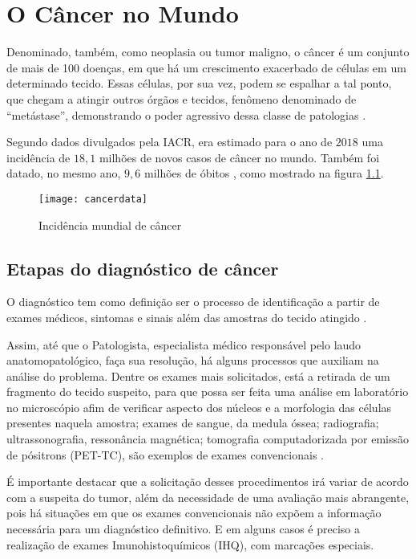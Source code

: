 \chapter{O Câncer no Mundo}
\label{chapter:o_cancer_no_mundo}

Denominado, também, como neoplasia ou tumor maligno, o câncer é um conjunto de
mais de 100 doenças, em que há um crescimento exacerbado de células em um
determinado tecido. Essas células, por sua vez, podem se espalhar a tal ponto,
que chegam a atingir outros órgãos e tecidos, fenômeno denominado de
“metástase”, demonstrando o poder agressivo dessa classe de patologias \cite{OQUEECANCER}.

Segundo dados divulgados pela IACR, 
era estimado para o ano de $2018$ uma incidência de $18,1$ milhões de novos casos de câncer no mundo.
Também foi datado, no mesmo ano, $9,6$ milhões de óbitos \cite{MOC}, como mostrado na figura \ref{fig:cancerdata}.

\begin{figure}[H]
\begin{center}
\caption{Incidência mundial de câncer}
\texttt{[image: cancerdata]}
\label{fig:cancerdata}
\end{center}
\end{figure}

\section{\textbf{Etapas do diagnóstico de câncer}}

O diagnóstico tem como definição ser o processo de identificação a partir de
exames médicos, sintomas e sinais além das amostras do tecido atingido \cite{ATLAS}.

Assim, até que o Patologista, especialista médico responsável pelo laudo anatomopatológico,
faça sua resolução, há alguns processos que auxiliam na análise do problema.
Dentre os exames mais solicitados, está a retirada de um fragmento do tecido suspeito,
para que possa ser feita uma análise em laboratório no microscópio afim de verificar aspecto dos núcleos e
a morfologia das células presentes naquela amostra;
exames de sangue, da medula óssea; radiografia; ultrassonografia, ressonância magnética;
tomografia computadorizada por emissão de pósitrons (PET-TC), são exemplos de exames convencionais \cite{VENCER}.

É importante destacar que a solicitação desses procedimentos irá variar de acordo com a suspeita do tumor,
além da necessidade de uma avaliação mais abrangente,
pois há situações em que os exames convencionais não expõem a informação necessária para um diagnóstico definitivo.
E em alguns casos é preciso a realização de exames Imunohistoquímicos (IHQ), com marcações especiais.

